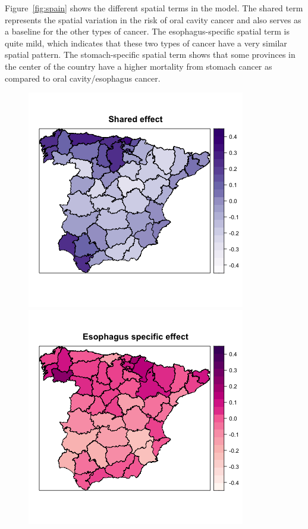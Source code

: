 
Figure~\ref{fig:spain} shows the different spatial terms in the model. The shared term represents the spatial variation in the risk of oral cavity cancer and also serves as a baseline for the other types of cancer. The esophagus-specific spatial term is quite mild, which indicates that these two types of cancer have a very similar spatial pattern. The stomach-specific spatial term shows that some provinces in the center of the country have a higher mortality from stomach cancer as compared to oral cavity/esophagus cancer.


\begin{figure}[h!]
\begin{center}
\includegraphics[scale=0.35]{images/Spain_Shared.png}
\includegraphics[scale=0.35]{images/Spain_Esophagus_specific.png}

\end{center}
\end{figure}
